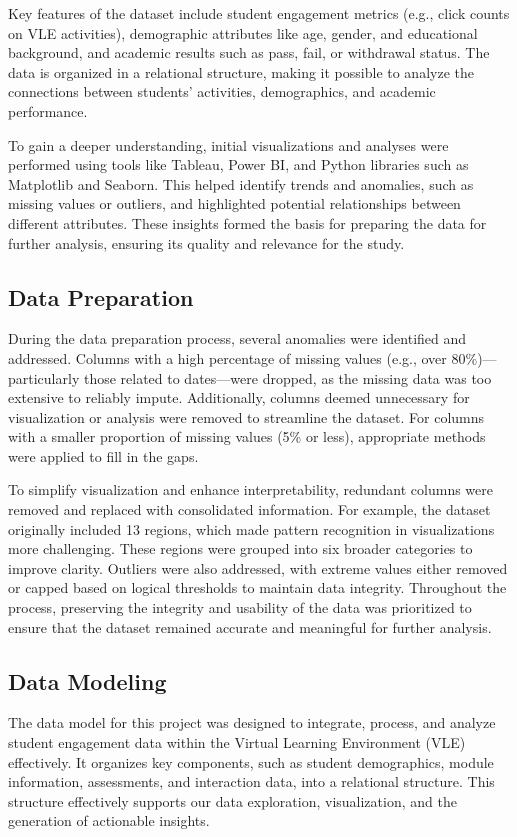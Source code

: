 Key features of the dataset include student engagement metrics (e.g., click counts on VLE activities), demographic attributes like age, gender, and educational background, and academic results such as pass, fail, or withdrawal status. The data is organized in a relational structure, making it possible to analyze the connections between students' activities, demographics, and academic performance.

To gain a deeper understanding, initial visualizations and analyses were performed using tools like Tableau, Power BI, and Python libraries such as Matplotlib and Seaborn. This helped identify trends and anomalies, such as missing values or outliers, and highlighted potential relationships between different attributes. These insights formed the basis for preparing the data for further analysis, ensuring its quality and relevance for the study.

\subsection*{Data Preparation}
During the data preparation process, several anomalies were identified and addressed. Columns with a high percentage of missing values (e.g., over 80\%)—particularly those related to dates—were dropped, as the missing data was too extensive to reliably impute. Additionally, columns deemed unnecessary for visualization or analysis were removed to streamline the dataset. For columns with a smaller proportion of missing values (5\% or less), appropriate methods were applied to fill in the gaps.

To simplify visualization and enhance interpretability, redundant columns were removed and replaced with consolidated information. For example, the dataset originally included 13 regions, which made pattern recognition in visualizations more challenging. These regions were grouped into six broader categories to improve clarity. Outliers were also addressed, with extreme values either removed or capped based on logical thresholds to maintain data integrity. Throughout the process, preserving the integrity and usability of the data was prioritized to ensure that the dataset remained accurate and meaningful for further analysis.

\subsection*{Data Modeling}
The data model for this project was designed to integrate, process, and analyze student engagement data within the Virtual Learning Environment (VLE) effectively. It organizes key components, such as student demographics, module information, assessments, and interaction data, into a relational structure. This structure effectively supports our data exploration, visualization, and the generation of actionable insights.


